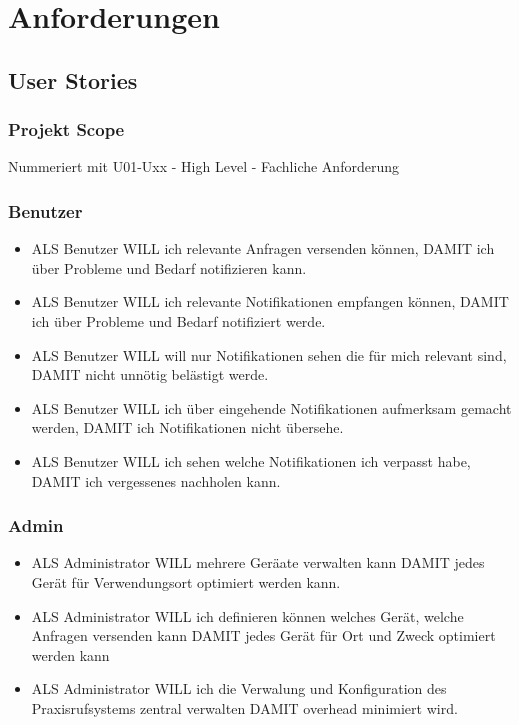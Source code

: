 \section{Anforderungen}

\subsection{User Stories}

    \subsubsection*{Projekt Scope}


    Nummeriert mit U01-Uxx - High Level - Fachliche Anforderung

    \subsubsection*{Benutzer}

        \begin{itemize}
            \item ALS Benutzer WILL ich relevante Anfragen versenden können, DAMIT ich über Probleme und Bedarf notifizieren kann. 
            \item ALS Benutzer WILL ich relevante Notifikationen empfangen können, DAMIT ich über Probleme und Bedarf notifiziert werde.   
            \item ALS Benutzer WILL will nur Notifikationen sehen die für mich relevant sind, DAMIT nicht unnötig belästigt werde.   
            \item ALS Benutzer WILL ich über eingehende Notifikationen aufmerksam gemacht werden, DAMIT ich Notifikationen nicht übersehe.   
            \item ALS Benutzer WILL ich sehen welche Notifikationen ich verpasst habe, DAMIT ich vergessenes nachholen kann.   
        \end{itemize}



    \subsubsection*{Admin}

    \begin{itemize}
        \item ALS Administrator WILL mehrere Geräate verwalten kann DAMIT jedes Gerät für Verwendungsort optimiert werden kann. 
        \item ALS Administrator WILL ich definieren können welches Gerät, welche Anfragen versenden kann DAMIT jedes Gerät für Ort und Zweck optimiert werden kann 
        \item ALS Administrator WILL ich die Verwalung und Konfiguration des Praxisrufsystems zentral verwalten DAMIT overhead minimiert wird. 
    \end{itemize}

